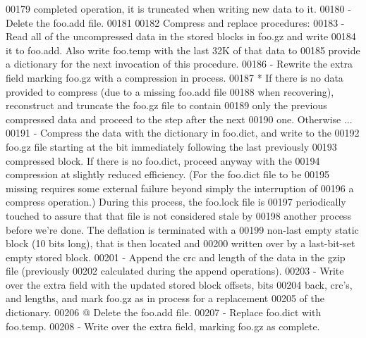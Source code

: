 \begin{DoxyCode}
00179 \textcolor{comment}{     completed operation, it is truncated when writing new data to it.}
00180 \textcolor{comment}{   - Delete the foo.add file.}
00181 \textcolor{comment}{}
00182 \textcolor{comment}{   Compress and replace procedures:}
00183 \textcolor{comment}{   - Read all of the uncompressed data in the stored blocks in foo.gz and write}
00184 \textcolor{comment}{     it to foo.add.  Also write foo.temp with the last 32K of that data to}
00185 \textcolor{comment}{     provide a dictionary for the next invocation of this procedure.}
00186 \textcolor{comment}{   - Rewrite the extra field marking foo.gz with a compression in process.}
00187 \textcolor{comment}{   * If there is no data provided to compress (due to a missing foo.add file}
00188 \textcolor{comment}{     when recovering), reconstruct and truncate the foo.gz file to contain}
00189 \textcolor{comment}{     only the previous compressed data and proceed to the step after the next}
00190 \textcolor{comment}{     one.  Otherwise ...}
00191 \textcolor{comment}{   - Compress the data with the dictionary in foo.dict, and write to the}
00192 \textcolor{comment}{     foo.gz file starting at the bit immediately following the last previously}
00193 \textcolor{comment}{     compressed block.  If there is no foo.dict, proceed anyway with the}
00194 \textcolor{comment}{     compression at slightly reduced efficiency.  (For the foo.dict file to be}
00195 \textcolor{comment}{     missing requires some external failure beyond simply the interruption of}
00196 \textcolor{comment}{     a compress operation.)  During this process, the foo.lock file is}
00197 \textcolor{comment}{     periodically touched to assure that that file is not considered stale by}
00198 \textcolor{comment}{     another process before we're done.  The deflation is terminated with a}
00199 \textcolor{comment}{     non-last empty static block (10 bits long), that is then located and}
00200 \textcolor{comment}{     written over by a last-bit-set empty stored block.}
00201 \textcolor{comment}{   - Append the crc and length of the data in the gzip file (previously}
00202 \textcolor{comment}{     calculated during the append operations).}
00203 \textcolor{comment}{   - Write over the extra field with the updated stored block offsets, bits}
00204 \textcolor{comment}{     back, crc's, and lengths, and mark foo.gz as in process for a replacement}
00205 \textcolor{comment}{     of the dictionary.}
00206 \textcolor{comment}{   @ Delete the foo.add file.}
00207 \textcolor{comment}{   - Replace foo.dict with foo.temp.}
00208 \textcolor{comment}{   - Write over the extra field, marking foo.gz as complete.}

\end{DoxyCode}
